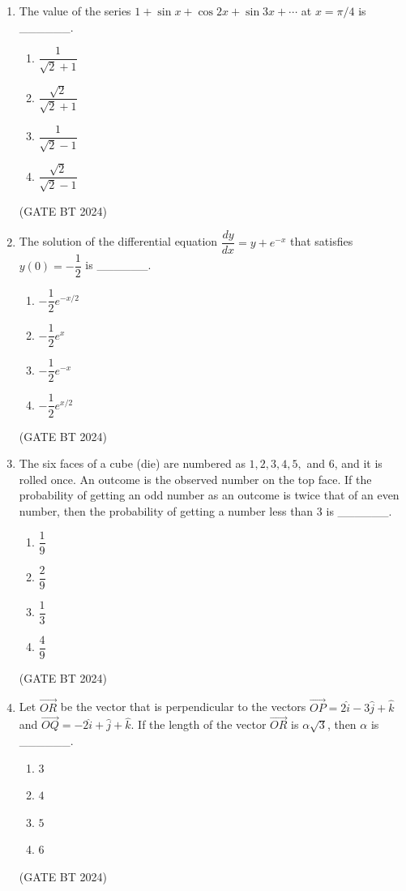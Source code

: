 \documentclass[journal,12pt,onecolumn]{IEEEtran}
\theoremstyle{remark}
\begin{document}
\begin{enumerate}
\item 
The value of the series $1+\sin x+\cos 2x+\sin 3x+\cdots$ at $x=\pi/4$ is \_\_\_\_\_\_.
\begin{multicols}{2}
\begin{enumerate}
    \item $\dfrac{1}{\sqrt{2}+1}$
    \item $\dfrac{\sqrt{2}}{\sqrt{2}+1}$
    \item $\dfrac{1}{\sqrt{2}-1}$
    \item $\dfrac{\sqrt{2}}{\sqrt{2}-1}$
\end{enumerate}
\end{multicols}
\hfill(GATE BT 2024)

\item 
The solution of the differential equation $\dfrac{dy}{dx}=y+e^{-x}$ that satisfies $y(0)=-\dfrac{1}{2}$ is \_\_\_\_\_\_.
\begin{multicols}{2}
\begin{enumerate}
    \item $-\dfrac{1}{2}e^{-x/2}$
    \item $-\dfrac{1}{2}e^{x}$
    \item $-\dfrac{1}{2}e^{-x}$
    \item $-\dfrac{1}{2}e^{x/2}$
\end{enumerate}
\end{multicols}
\hfill(GATE BT 2024)

\item 
The six faces of a cube (die) are numbered as $1, 2, 3, 4, 5,$ and $6$, and it is rolled once. An outcome is the observed number on the top face. If the probability of getting an odd number as an outcome is twice that of an even number, then the probability of getting a number less than $3$ is \_\_\_\_\_\_.
\begin{multicols}{2}
\begin{enumerate}
    \item $\dfrac{1}{9}$
    \item $\dfrac{2}{9}$
    \item $\dfrac{1}{3}$
    \item $\dfrac{4}{9}$
\end{enumerate}
\end{multicols}
\hfill(GATE BT 2024)

\item 
Let $\vec{OR}$ be the vector that is perpendicular to the vectors $\vec{OP}=2\hat{i}-3\hat{j}+\hat{k}$ and $\vec{OQ}=-2\hat{i}+\hat{j}+\hat{k}$. If the length of the vector $\vec{OR}$ is $\alpha\sqrt{3}$, then $\alpha$ is \_\_\_\_\_\_.
\begin{multicols}{2}
\begin{enumerate}
    \item $3$
    \item $4$
    \item $5$
    \item $6$
\end{enumerate}
\end{multicols}
\hfill(GATE BT 2024)


\end{enumerate}
\end{document}
